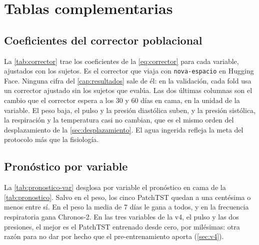 \chapter{Tablas complementarias}\label{ap:complementos}

\section{Coeficientes del corrector poblacional}

La \cref{tab:corrector} trae los coeficientes de la \cref{eq:corrector} para cada variable, ajustados con los
 sujetos. Es el corrector que viaja con \texttt{nova-espacio} en Hugging Face. Ninguna cifra del
\cref{cap:resultados} sale de él: en la validación, cada fold usa un corrector ajustado sin los sujetos que evalúa.
Las dos últimas columnas son el cambio que el corrector espera a los 30 y 60 días en cama, en la unidad de la variable.
El peso baja, el pulso y la presión diastólica suben, y la presión sistólica, la respiración y la temperatura casi no
cambian, que es el mismo orden del desplazamiento de la \cref{sec:desplazamiento}. El agua ingerida refleja la meta del
protocolo más que la fisiología.

\begin{table}[htbp]
\caption[Coeficientes del corrector poblacional]{Coeficientes del corrector poblacional
$\Delta(d) = \beta_0 + \beta_1 \log(1+d) + \beta_2\, d/30$, ajustado con todos los sujetos, y su valor a los 30 y
60 días en cama.}
\label{tab:corrector}
\centering\small

\end{table}

\section{Pronóstico por variable}

La \cref{tab:pronostico-var} desglosa por variable el pronóstico en cama de la \cref{tab:pronostico}. Salvo en el peso, los
cinco PatchTST quedan a una centésima o menos entre sí. En el peso la media de 7 días le gana a todos, y en la
frecuencia respiratoria gana Chronos-2. En las tres variables de la v4, el pulso y las dos presiones, el mejor es el
PatchTST entrenado desde cero, por milésimas: otra razón para no dar por hecho que el pre-entrenamiento aporta
(\cref{sec:v4}).

\begin{table}[htbp]
\caption[Pronóstico en cama por variable]{MAE del pronóstico a 7 días en cama, relativo a la persistencia, por
variable. En negrita el menor de cada fila, comparado con todos sus decimales. Cero: PatchTST entrenado solo con el
reposo. Sin LS: pre-entrenado sin LifeSnaps. Tierra: sin adaptar. Cabeza y Todo: adaptados desde Tierra.}
\label{tab:pronostico-var}
\centering\small

\end{table}
